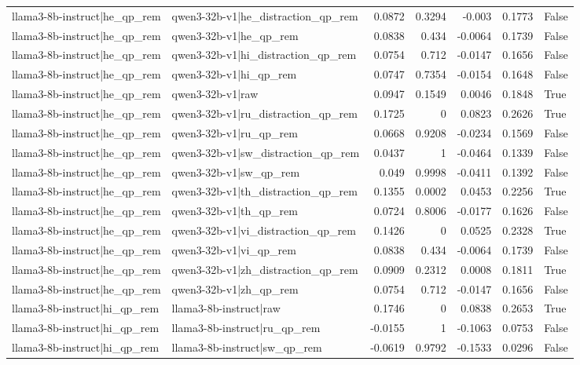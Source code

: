 \begin{table}
\begin{tabular}{l l r r r r l}
llama3-8b-instruct|he_qp_rem & qwen3-32b-v1|he_distraction_qp_rem & 0.0872 & 0.3294 & -0.003 & 0.1773 & False \\
llama3-8b-instruct|he_qp_rem & qwen3-32b-v1|he_qp_rem & 0.0838 & 0.434 & -0.0064 & 0.1739 & False \\
llama3-8b-instruct|he_qp_rem & qwen3-32b-v1|hi_distraction_qp_rem & 0.0754 & 0.712 & -0.0147 & 0.1656 & False \\
llama3-8b-instruct|he_qp_rem & qwen3-32b-v1|hi_qp_rem & 0.0747 & 0.7354 & -0.0154 & 0.1648 & False \\
llama3-8b-instruct|he_qp_rem & qwen3-32b-v1|raw & 0.0947 & 0.1549 & 0.0046 & 0.1848 & True \\
llama3-8b-instruct|he_qp_rem & qwen3-32b-v1|ru_distraction_qp_rem & 0.1725 & 0 & 0.0823 & 0.2626 & True \\
llama3-8b-instruct|he_qp_rem & qwen3-32b-v1|ru_qp_rem & 0.0668 & 0.9208 & -0.0234 & 0.1569 & False \\
llama3-8b-instruct|he_qp_rem & qwen3-32b-v1|sw_distraction_qp_rem & 0.0437 & 1 & -0.0464 & 0.1339 & False \\
llama3-8b-instruct|he_qp_rem & qwen3-32b-v1|sw_qp_rem & 0.049 & 0.9998 & -0.0411 & 0.1392 & False \\
llama3-8b-instruct|he_qp_rem & qwen3-32b-v1|th_distraction_qp_rem & 0.1355 & 0.0002 & 0.0453 & 0.2256 & True \\
llama3-8b-instruct|he_qp_rem & qwen3-32b-v1|th_qp_rem & 0.0724 & 0.8006 & -0.0177 & 0.1626 & False \\
llama3-8b-instruct|he_qp_rem & qwen3-32b-v1|vi_distraction_qp_rem & 0.1426 & 0 & 0.0525 & 0.2328 & True \\
llama3-8b-instruct|he_qp_rem & qwen3-32b-v1|vi_qp_rem & 0.0838 & 0.434 & -0.0064 & 0.1739 & False \\
llama3-8b-instruct|he_qp_rem & qwen3-32b-v1|zh_distraction_qp_rem & 0.0909 & 0.2312 & 0.0008 & 0.1811 & True \\
llama3-8b-instruct|he_qp_rem & qwen3-32b-v1|zh_qp_rem & 0.0754 & 0.712 & -0.0147 & 0.1656 & False \\
llama3-8b-instruct|hi_qp_rem & llama3-8b-instruct|raw & 0.1746 & 0 & 0.0838 & 0.2653 & True \\
llama3-8b-instruct|hi_qp_rem & llama3-8b-instruct|ru_qp_rem & -0.0155 & 1 & -0.1063 & 0.0753 & False \\
llama3-8b-instruct|hi_qp_rem & llama3-8b-instruct|sw_qp_rem & -0.0619 & 0.9792 & -0.1533 & 0.0296 & False \\

\end{tabular}
\end{table}
